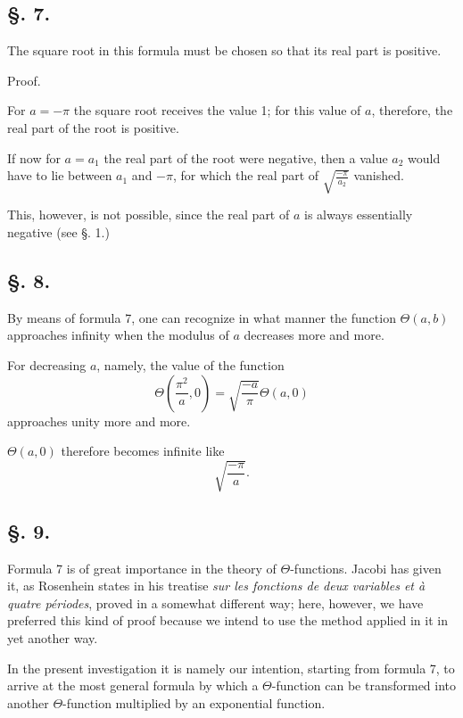\documentclass[10pt]{article}
\newcommand{\sourceanchor}[1]{\hypertarget{source-#1}{}}
\begin{document}
\subsection*{\S. 7.}
The square root in this formula must be chosen so that its real part is positive.

\begin{center}Proof.\end{center}
For \(a=-\pi\) the square root receives the value 1; for this value of \(a\), therefore, the real part of the root is positive.

If now for \(a=a_{1}\) the real part of the root were negative, then a value \(a_{2}\) would have to lie between \(a_{1}\) and \(-\pi\), for which the real part of \(\sqrt{\frac{-\pi}{a_{2}}}\) vanished.

This, however, is not possible, since the real part of \(a\) is always essentially negative (see \S. 1.)

\subsection*{\S. 8.}
By means of formula 7, one can recognize in what manner the function \(\Theta(a,b)\) approaches infinity when the modulus of \(a\) decreases more and more.

For decreasing \(a\), namely, the value of the function
\[
\Theta\!\left(\frac{\pi^{2}}{a},0\right)=\sqrt{\frac{-a}{\pi}}\Theta(a,0)
\]
approaches unity more and more.

\(\Theta(a,0)\) therefore becomes infinite like
\[
\sqrt{\frac{-\pi}{a}}.
\]

\subsection*{\S. 9.}
Formula 7 is of great importance in the theory of \(\Theta\)-functions. Jacobi has given it, as Rosenhein states in his treatise \textit{sur les fonctions de deux variables et à quatre périodes}, proved in a somewhat different way; here, however, we have preferred this kind of proof because we intend to use the method applied in it in yet another way.

\sourceanchor{PA08}
In the present investigation it is namely our intention, starting from formula 7, to arrive at the most general formula by which a \(\Theta\)-function can be transformed into another \(\Theta\)-function multiplied by an exponential function.
\end{document}
